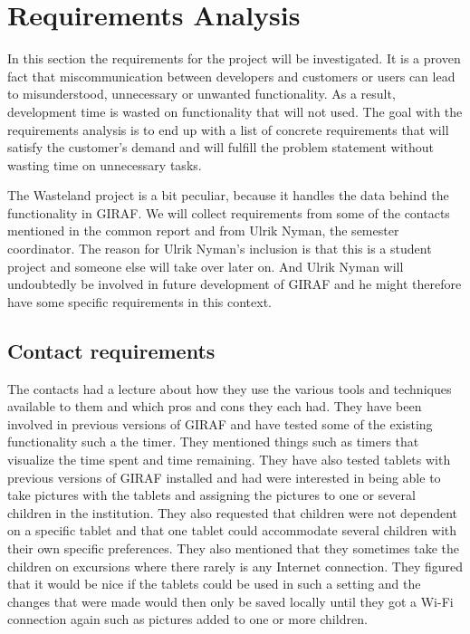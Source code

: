 \section{Requirements Analysis}
In this section the requirements for the project will be investigated. It is a proven fact that miscommunication between developers and customers or users can lead to misunderstood, unnecessary or unwanted functionality.\cite{req_wrong} %
As a result, development time is wasted on functionality that will not used. The goal with the requirements analysis is to end up with a list of concrete requirements that will satisfy the customer's demand and will fulfill the problem statement without wasting time on unnecessary tasks. 

The Wasteland project is a bit peculiar, because it handles the data behind the functionality in GIRAF. We will collect requirements from some of the contacts mentioned in the common report and from Ulrik Nyman, the semester coordinator. The reason for Ulrik Nyman's inclusion is that this is a student project and someone else will take over later on. And Ulrik Nyman will undoubtedly be involved in future development of GIRAF and he might therefore have some specific requirements in this context.

\subsection{Contact requirements}
The contacts had a lecture about how they use the various tools and techniques available to them and which pros and cons they each had. They have been involved in previous versions of GIRAF and have tested some of the existing functionality such a the timer. They mentioned things such as timers that visualize the time spent and time remaining. They have also tested tablets with previous versions of GIRAF installed and had were interested in being able to take pictures with the tablets and assigning the pictures to one or several children in the institution. They also requested that children were not dependent on a specific tablet and that one tablet could accommodate several children with their own specific preferences. They also mentioned that they sometimes take the children on excursions where there rarely is any Internet connection. They figured that it would be nice if the tablets could be used in such a setting and the changes that were made would then only be saved locally until they got a Wi-Fi connection again such as pictures added to one or more children.

